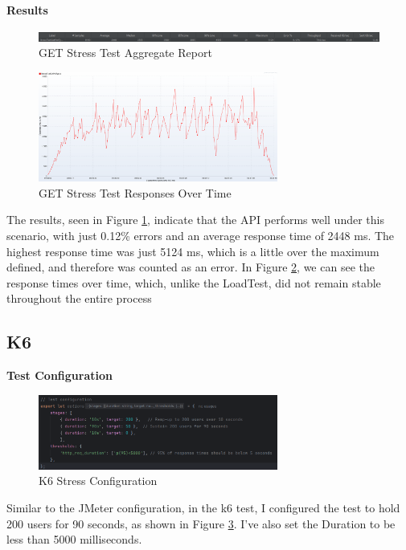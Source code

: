 \documentclass[a4paper,11pt,openright,BCOR=15mm]{scrbook}
\begin{document}
		
		\textbf{Results}
		\begin{figure}[H]
			\centering
			\includegraphics[width=\textwidth]{figs/Performance/Results/JMETER GET STRESS AR.png}
			\caption{GET Stress Test Aggregate Report}
			\label{fig:GETStressAggregateReport}
		\end{figure}
		\begin{figure}[H]
			\centering
			\includegraphics[width=0.7\textwidth]{figs/Performance/Results/JMETER GET STRESS ROT.png}
			\caption{GET Stress Test Responses Over Time}
			\label{fig:GETStressResposesOverTime}
		\end{figure}
		The results, seen in Figure \ref{fig:GETStressAggregateReport}, indicate that the API performs well under this scenario, with just 0.12\% errors and an average response time of 2448 ms. The highest response time was just 5124 ms, which is a little over the maximum defined, and therefore was counted as an error.
		In Figure \ref{fig:GETStressResposesOverTime}, we can see the response times over time, which, unlike the LoadTest, did not remain stable throughout the entire process	

		
		\subsection{K6}
		\textbf{Test Configuration}
		\begin{figure}[H]
			\centering
			\includegraphics[width=0.7\textwidth]{figs/Performance/Test Configuration/K6-STRESS.png}
			\caption{K6 Stress Configuration}
			\label{fig:K6-STRESS}
		\end{figure}
		Similar to the JMeter configuration, in the k6 test, I configured the test to hold 200 users for 90 seconds, as shown in Figure \ref{fig:K6-STRESS}. I've also set the Duration to be less than 5000 milliseconds.
\end{document}
